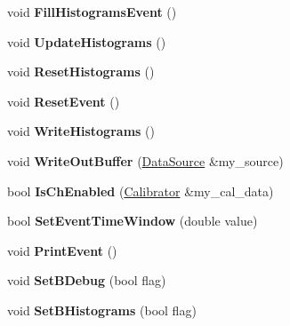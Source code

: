 \begin{DoxyCompactItemize}
\item 
\hypertarget{classAnalysis_aac936a81400f18975af55043a8462fea}{void {\bfseries Fill\-Histograms\-Event} ()}\label{classAnalysis_aac936a81400f18975af55043a8462fea}

\item 
\hypertarget{classAnalysis_a5c82e57f8a238d847b603d6ee096f16b}{void {\bfseries Update\-Histograms} ()}\label{classAnalysis_a5c82e57f8a238d847b603d6ee096f16b}

\item 
\hypertarget{classAnalysis_a5cb6bccbd5c0ddaaf9a3c6ed216352f6}{void {\bfseries Reset\-Histograms} ()}\label{classAnalysis_a5cb6bccbd5c0ddaaf9a3c6ed216352f6}

\item 
\hypertarget{classAnalysis_ac63c498af33d55526e4faf89ff4aed72}{void {\bfseries Reset\-Event} ()}\label{classAnalysis_ac63c498af33d55526e4faf89ff4aed72}

\item 
\hypertarget{classAnalysis_acd5f9382c18b82835431ba127ff79a6c}{void {\bfseries Write\-Histograms} ()}\label{classAnalysis_acd5f9382c18b82835431ba127ff79a6c}

\item 
\hypertarget{classAnalysis_a5bde2aa071c458976fd4d90e8f577fb7}{void {\bfseries Write\-Out\-Buffer} (\hyperlink{classDataSource}{Data\-Source} \&my\-\_\-source)}\label{classAnalysis_a5bde2aa071c458976fd4d90e8f577fb7}

\item 
\hypertarget{classAnalysis_a2b12b00bda7f6a53ac0d7eb8b6a9f98b}{bool {\bfseries Is\-Ch\-Enabled} (\hyperlink{classCalibrator}{Calibrator} \&my\-\_\-cal\-\_\-data)}\label{classAnalysis_a2b12b00bda7f6a53ac0d7eb8b6a9f98b}

\item 
\hypertarget{classAnalysis_a40784904bec827cc7a6a34b01d7d148c}{bool {\bfseries Set\-Event\-Time\-Window} (double value)}\label{classAnalysis_a40784904bec827cc7a6a34b01d7d148c}

\item 
\hypertarget{classAnalysis_aee81123c9bd56f06468e9b0da9230803}{void {\bfseries Print\-Event} ()}\label{classAnalysis_aee81123c9bd56f06468e9b0da9230803}

\item 
\hypertarget{classAnalysis_aace40580ef23453e3bfb1075554e076e}{void {\bfseries Set\-B\-Debug} (bool flag)}\label{classAnalysis_aace40580ef23453e3bfb1075554e076e}

\item 
\hypertarget{classAnalysis_af13631304f9dbfe58969c179da01ee9e}{void {\bfseries Set\-B\-Histograms} (bool flag)}\label{classAnalysis_af13631304f9dbfe58969c179da01ee9e}


\end{DoxyCompactItemize}
